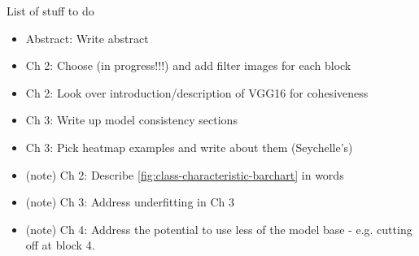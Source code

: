 
List of stuff to do

\begin{itemize}
\item Abstract: Write abstract
\item Ch 2: Choose (in progress!!!) and add filter images for each block
\item Ch 2: Look over introduction/description of VGG16 for cohesiveness
\item Ch 3: Write up model consistency sections
\item Ch 3: Pick heatmap examples and write about them (Seychelle's)

\item (\fix note) Ch 2: Describe \autoref{fig:class-characteristic-barchart} in words
\item (\fix note) Ch 3: Address underfitting in Ch 3
\item (\fix note) Ch 4: Address the potential to use less of the model base - e.g. cutting off at block 4.
\end{itemize}
